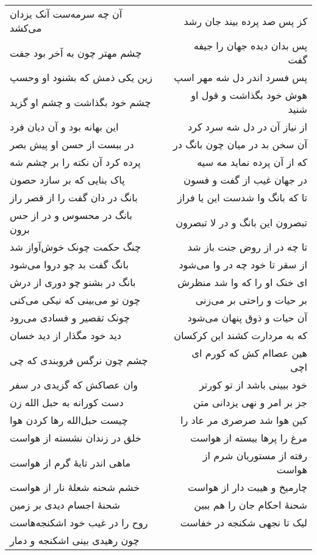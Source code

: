 \begin{center}
\begin{longtable}{l p{0.5cm} r}
\\
آن چه سرمه‌ست آنک یزدان می‌کشد
&&
کز پس صد پرده بیند جان رشد
\\
چشم مهتر چون به آخر بود جفت
&&
پس بدان دیده جهان را جیفه گفت
\\
زین یکی ذمش که بشنود او وحسپ
&&
پس فسرد اندر دل شه مهر اسپ
\\
چشم خود بگذاشت و چشم او گزید
&&
هوش خود بگذاشت و قول او شنید
\\
این بهانه بود و آن دیان فرد
&&
از نیاز آن در دل شه سرد کرد
\\
در ببست از حسن او پیش بصر
&&
آن سخن بد در میان چون بانگ در
\\
پرده کرد آن نکته را بر چشم شه
&&
که از آن پرده نماید مه سیه
\\
پاک بنایی که بر سازد حصون
&&
در جهان غیب از گفت و فسون
\\
بانگ در دان گفت را از قصر راز
&&
تا که بانگ وا شدست این یا فراز
\\
بانگ در محسوس و در از حس برون
&&
تبصرون این بانگ و در لا تبصرون
\\
چنگ حکمت چونک خوش‌آواز شد
&&
تا چه در از روض جنت باز شد
\\
بانگ گفت بد چو دروا می‌شود
&&
از سقر تا خود چه در وا می‌شود
\\
بانگ در بشنو چو دوری از درش
&&
ای خنک او را که وا شد منظرش
\\
چون تو می‌بینی که نیکی می‌کنی
&&
بر حیات و راحتی بر می‌زنی
\\
چونک تقصیر و فسادی می‌رود
&&
آن حیات و ذوق پنهان می‌شود
\\
دید خود مگذار از دید خسان
&&
که به مردارت کشند این کرکسان
\\
چشم چون نرگس فروبندی که چی
&&
هین عصاام کش که کورم ای اچی
\\
وان عصاکش که گزیدی در سفر
&&
خود ببینی باشد از تو کورتر
\\
دست کورانه به حبل الله زن
&&
جز بر امر و نهی یزدانی متن
\\
چیست حبل‌الله رها کردن هوا
&&
کین هوا شد صرصری مر عاد را
\\
خلق در زندان نشسته از هواست
&&
مرغ را پرها ببسته از هواست
\\
ماهی اندر تابهٔ گرم از هواست
&&
رفته از مستوریان شرم از هواست
\\
خشم شحنه شعلهٔ نار از هواست
&&
چارمیخ و هیبت دار از هواست
\\
شحنهٔ اجسام دیدی بر زمین
&&
شحنهٔ احکام جان را هم ببین
\\
روح را در غیب خود اشکنجه‌هاست
&&
لیک تا نجهی شکنجه در خفاست
\\
چون رهیدی بینی اشکنجه و دمار

\end{longtable}
\end{center}
